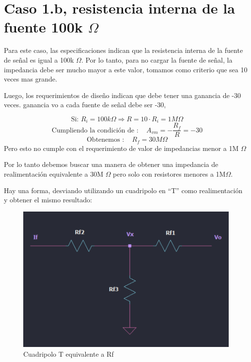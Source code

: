 \newpage
\section{Caso 1.b, resistencia interna de la fuente 100k $\Omega$}

Para este caso, las especificaciones indican que la resistencia interna de la fuente de señal es igual a 100k $\Omega$. Por lo tanto, para no cargar la fuente de señal, la impedancia debe ser mucho mayor a este valor, tomamos como criterio que sea 10 veces mas grande.

Luego, los requerimientos de diseño indican que debe tener una ganancia de -30 veces. 
ganancia vo a cada fuente de señal debe ser -30, 

\[ \text { Si: } R_{i}=100k \Omega \Longrightarrow R=10 \cdot R_{i} = 1 M\Omega \]
\[ \text { Cumpliendo la condición de }: \quad A_{vm} =-\frac{R_{f}}{R}=-30 \]
\[ \text { Obtenemos }: \quad R_{f}=30 M\Omega \]
Pero esto no cumple con el requerimiento de valor de impedancias menor a 1M $\Omega$
\vspace{1em}

Por lo tanto debemos buscar una manera de obtener una impedancia de realimentación equivalente a 30M $\Omega$ pero solo con resistores menores a 1M$\Omega$.

Hay una forma, desviando utilizando un cuadripolo en ``T'' como realimentación y obtener el mismo resultado:


\begin{figure}[h!]
    \centering
    \includegraphics[width=1\linewidth]{img/cuadripoloT.png}
    \caption{Cuadripolo T equivalente a Rf}
    \label{fig:cuadripoloT}
\end{figure}

